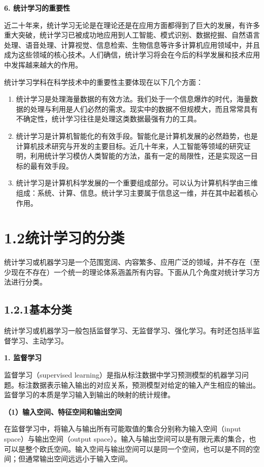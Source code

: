 \documentclass[UTF8, 12pt, fontset=fandol, oneside]{ctexart}
\begin{document}
\noindent\textbf{6. 统计学习的重要性}

近二十年来，统计学习无论是在理论还是在应用方面都得到了巨大的发展，有许多重大突破，统计学习已被成功地应用到人工智能、模式识别、数据挖掘、自然语言处理、语音处理、计算视觉、信息检索、生物信息等许多计算机应用领域中，并且成为这些领域的核心技术。人们确信，统计学习将会在今后的科学发展和技术应用中发挥越来越大的作用。

统计学习学科在科学技术中的重要性主要体现在以下几个方面：
\begin{enumerate}
  \item 统计学习是处理海量数据的有效方法。我们处于一个信息爆炸的时代，海量数据的处理与利用是人们必然的需求。现实中的数据不但规模大，而且常常具有不确定性，统计学习往往是处理这类数据最强有力的工具。
  \item 统计学习是计算机智能化的有效手段。智能化是计算机发展的必然趋势，也是计算机技术研究与开发的主要目标。近几十年来，人工智能等领域的研究证明，利用统计学习模仿人类智能的方法，虽有一定的局限性，还是实现这一目标的最有效手段。
  \item 统计学习是计算机科学发展的一个重要组成部分。可以认为计算机科学由三维组成：系统、计算、信息。统计学习主要属于信息这一维，并在其中起着核心作用。
\end{enumerate}

\section*{1.2\quad 统计学习的分类}

统计学习或机器学习是一个范围宽阔、内容繁多、应用广泛的领域，并不存在（至少现在不存在）一个统一的理论体系涵盖所有内容。下面从几个角度对统计学习方法进行分类。

\subsection*{1.2.1\quad 基本分类}

统计学习或机器学习一般包括监督学习、无监督学习、强化学习。有时还包括半监督学习、主动学习。

\noindent\textbf{1. 监督学习}

监督学习（supervised learning）是指从标注数据中学习预测模型的机器学习问题。标注数据表示输入输出的对应关系，预测模型对给定的输入产生相应的输出。监督学习的本质是学习输入到输出的映射的统计规律。

\noindent\textbf{（1）输入空间、特征空间和输出空间}

在监督学习中，将输入与输出所有可能取值的集合分别称为输入空间（input space）与输出空间（output space）。输入与输出空间可以是有限元素的集合，也可以是整个欧氏空间。输入空间与输出空间可以是同一个空间，也可以是不同的空间；但通常输出空间远远小于输入空间。
\end{document}
